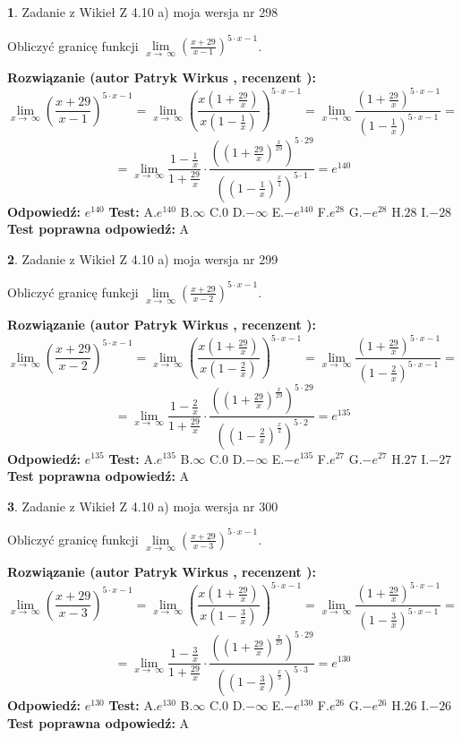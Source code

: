 \documentclass[12pt, a4paper]{article}
\theoremstyle{definition} %
\newtheorem{zad}{}
\newcommand{\zadStart}[1]{\begin{zad}#1\newline}
\newcommand{\zadStop}{\end{zad}}
\newcommand{\rozwStart}[2]{\noindent \textbf{Rozwiązanie (autor #1 , recenzent #2): }\newline}
\newcommand{\rozwStop}{\newline}
\newcommand{\odpStart}{\noindent \textbf{Odpowiedź:}\newline}
\newcommand{\odpStop}{\newline}
\newcommand{\testStart}{\noindent \textbf{Test:}\newline}
\newcommand{\testStop}{\newline}
\newcommand{\kluczStart}{\noindent \textbf{Test poprawna odpowiedź:}\newline}
\newcommand{\kluczStop}{\newline}
\begin{document}
\zadStart{Zadanie z Wikieł Z 4.10 a) moja wersja nr 298}

Obliczyć granicę funkcji  $\lim\limits_{x\to\ \infty}(\frac{x+29}{x-1})^{5\cdot x-1}$.
\zadStop
\rozwStart{Patryk Wirkus}{}
$$\lim\limits_{x\to\ \infty}(\frac{x+29}{x-1})^{5\cdot x-1} = \lim\limits_{x\to\ \infty}(\frac{x(1+\frac{29}{x})}{x(1-\frac{1}{x})})^{5\cdot x-1}=\lim\limits_{x\to\ \infty}\frac{(1+\frac{29}{x})^{5\cdot x-1}}{(1-\frac{1}{x})^{5\cdot x-1}}=$$
$$=\lim\limits_{x\to\ \infty}\frac{1-\frac{1}{x}}{1+\frac{29}{x}}\cdot\frac{((1+\frac{29}{x})^{\frac{x}{29}})^{5\cdot29}}{((1-\frac{1}{x})^{\frac{x}{1}})^{5\cdot1}}=e^{140}$$
\rozwStop
\odpStart
$e^{140}$
\odpStop
\testStart
A.$e^{140}$ B.$\infty$ C.$0$ D.$-\infty$ E.$-e^{140}$
F.$e^{28}$ G.$-e^{28}$
H.$28$
I.$-28$
\testStop
\kluczStart
A
\kluczStop



\zadStart{Zadanie z Wikieł Z 4.10 a) moja wersja nr 299}

Obliczyć granicę funkcji  $\lim\limits_{x\to\ \infty}(\frac{x+29}{x-2})^{5\cdot x-1}$.
\zadStop
\rozwStart{Patryk Wirkus}{}
$$\lim\limits_{x\to\ \infty}(\frac{x+29}{x-2})^{5\cdot x-1} = \lim\limits_{x\to\ \infty}(\frac{x(1+\frac{29}{x})}{x(1-\frac{2}{x})})^{5\cdot x-1}=\lim\limits_{x\to\ \infty}\frac{(1+\frac{29}{x})^{5\cdot x-1}}{(1-\frac{2}{x})^{5\cdot x-1}}=$$
$$=\lim\limits_{x\to\ \infty}\frac{1-\frac{2}{x}}{1+\frac{29}{x}}\cdot\frac{((1+\frac{29}{x})^{\frac{x}{29}})^{5\cdot29}}{((1-\frac{2}{x})^{\frac{x}{2}})^{5\cdot2}}=e^{135}$$
\rozwStop
\odpStart
$e^{135}$
\odpStop
\testStart
A.$e^{135}$ B.$\infty$ C.$0$ D.$-\infty$ E.$-e^{135}$
F.$e^{27}$ G.$-e^{27}$
H.$27$
I.$-27$
\testStop
\kluczStart
A
\kluczStop



\zadStart{Zadanie z Wikieł Z 4.10 a) moja wersja nr 300}

Obliczyć granicę funkcji  $\lim\limits_{x\to\ \infty}(\frac{x+29}{x-3})^{5\cdot x-1}$.
\zadStop
\rozwStart{Patryk Wirkus}{}
$$\lim\limits_{x\to\ \infty}(\frac{x+29}{x-3})^{5\cdot x-1} = \lim\limits_{x\to\ \infty}(\frac{x(1+\frac{29}{x})}{x(1-\frac{3}{x})})^{5\cdot x-1}=\lim\limits_{x\to\ \infty}\frac{(1+\frac{29}{x})^{5\cdot x-1}}{(1-\frac{3}{x})^{5\cdot x-1}}=$$
$$=\lim\limits_{x\to\ \infty}\frac{1-\frac{3}{x}}{1+\frac{29}{x}}\cdot\frac{((1+\frac{29}{x})^{\frac{x}{29}})^{5\cdot29}}{((1-\frac{3}{x})^{\frac{x}{3}})^{5\cdot3}}=e^{130}$$
\rozwStop
\odpStart
$e^{130}$
\odpStop
\testStart
A.$e^{130}$ B.$\infty$ C.$0$ D.$-\infty$ E.$-e^{130}$
F.$e^{26}$ G.$-e^{26}$
H.$26$
I.$-26$
\testStop
\kluczStart
A
\kluczStop
\end{document}
